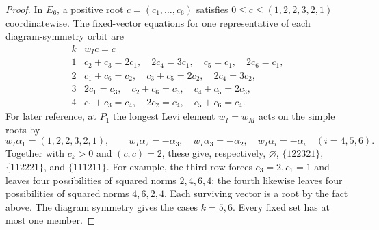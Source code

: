 \documentclass[12pt]{amsart}
\numberwithin{equation}{section}
\theoremstyle{plain}
\theoremstyle{definition}
\theoremstyle{remark}
\begin{document}
\begin{proof}
In $E_6$, a positive root $c=(c_1,\ldots,c_6)$ satisfies
$0\leq c\leq(1,2,2,3,2,1)$ coordinatewise. The fixed-vector equations
for one representative of each diagram-symmetry orbit are
\[
\begin{array}{c|l}
k& w_Ic=c\\\hline
1&c_2+c_3=2c_1,\quad 2c_4=3c_1,\quad c_5=c_1,\quad2c_6=c_1,\\
2&c_1+c_6=c_2,\quad c_3+c_5=2c_2,\quad2c_4=3c_2,\\
3&2c_1=c_3,\quad c_2+c_6=c_3,\quad c_4+c_5=2c_3,\\
4&c_1+c_3=c_4,\quad2c_2=c_4,\quad c_5+c_6=c_4.
\end{array}
\]
For later reference, at $P_1$ the longest Levi element
$w_I=w_M$ acts on the simple roots by
\begin{equation}\label{eq:realclass-E6-tau}
 w_I\alpha_1=(1,2,2,3,2,1),\qquad
 w_I\alpha_2=-\alpha_3,\quad w_I\alpha_3=-\alpha_2,\quad
 w_I\alpha_i=-\alpha_i\quad(i=4,5,6).
\end{equation}
Together with $c_k>0$ and $(c,c)=2$, these give, respectively,
$\varnothing$, $\{122321\}$, $\{112221\}$, and $\{111211\}$.
For example, the third row forces $c_3=2,c_1=1$ and leaves four
possibilities of squared norms $2,4,6,4$; the fourth likewise leaves
four possibilities of squared norms $4,6,2,4$. Each surviving vector is a
root by the fact above. The diagram symmetry gives the cases $k=5,6$.
Every fixed set has at most one member.


\end{proof}
\end{document}

